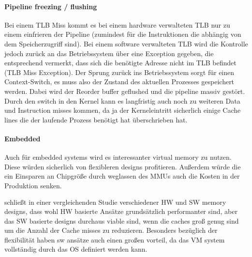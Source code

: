 \paragraph{Pipeline freezing / flushing} Bei einem TLB Miss  kommt es bei
einem hardware verwalteten TLB nur zu einem einfrieren der Pipeline (zumindest für die Instruktionen
die abhängig von dem Speicherzugriff sind). Bei einem software verwalteten TLB wird die Kontrolle
jedoch zurück an das Betriebssystem über eine Exception gegeben, die entsprechend vermerkt,
dass sich die benötigte Adresse nicht im TLB befindet (TLB Miss Exception).
Der Sprung zurück ins Betriebssystem sorgt für einen Context-Switch, es muss also der Zustand
des aktuellen Prozesses gespeichert werden. Dabei wird der Reorder buffer geflushed und die
pipeline massiv gestört. Durch den switch in den Kernel kann es langfristig auch noch zu weiteren
Data und Instruction misses kommen, da ja der Kerneleintritt sicherlich einige Cache lines die der
laufende Prozess benötigt hat überschrieben hat.

\paragraph{Embedded} Auch für embedded systems wird es interessanter virtual memory zu nutzen.
Diese würden sicherlich von flexibleren designs profitieren. Außerdem würde die ein Einsparen
an Chipgröße durch weglassen des MMUs auch die Kosten in der Produktion senken. \cite{jacob1998look}


\cite{jacob1998look} schließt in einer vergleichenden Studie verschiedener HW und SW memory designs,
dass wohl HW basierte Ansätze grundsätzlich performanter sind, aber das SW basierte designs durchaus
viable sind, wenn die caches groß genug sind um die Anzahl der Cache misses zu reduzieren.
Besonders bezüglich der flexibilität haben sw ansätze auch einen großen vorteil, da das VM system
vollständig durch das OS definiert werden kann.




